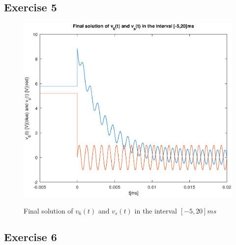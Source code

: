 \subsection{Exercise 5}
\label{sec:exercise5}


\begin{figure}[!ht] \centering
\caption{Final solution of $v_6(t)$ and $v_s(t)$ in the interval $[-5,20]ms$}
\includegraphics[width=0.8\linewidth]{theoretical_5.eps}
\label{fig:theoretical_5}
\end{figure}

\newpage
\subsection{Exercise 6}
\label{sec:exercise6}



